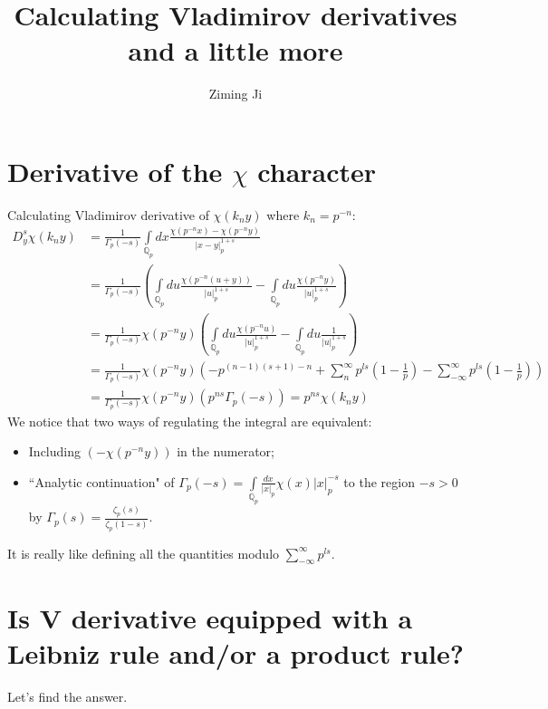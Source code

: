 \documentclass[12pt]{article}
\begin{document}
 
\title{Calculating Vladimirov derivatives and a little more}
\author{Ziming Ji}
 
\maketitle
 
\section{Derivative of the $\chi$ character}
Calculating Vladimirov derivative of $\chi(k_ny)$ where $k_n=p^{-n}$:
\begin{equation}
\begin{aligned}
D^s_y \chi(k_n y)&=\frac{1}{\Gamma_p (-s)} \int\limits _{\mathbb{Q}_p}dx \frac{\chi( p^{-n} x) - \chi( p^{-n}y)}{|x-y|_p^{1+s}}\\
&=\frac{1}{\Gamma_p (-s)} \left(\int\limits _{\mathbb{Q}_p}du \frac{\chi( p^{-n} (u+y))}{|u|_p^{1+s}}-\int\limits _{\mathbb{Q}_p}du \frac{\chi( p^{-n} y)}{|u|_p^{1+s}}\right)\\
&=\frac{1}{\Gamma_p (-s)} \chi( p^{-n} y)\left(\int\limits _{\mathbb{Q}_p}du \frac{\chi( p^{-n} u)}{|u|_p^{1+s}}-\int\limits _{\mathbb{Q}_p}du \frac{1}{|u|_p^{1+s}}\right)\\
&=\frac{1}{\Gamma_p (-s)} \chi( p^{-n} y)\left(-p^{(n-1)(s+1)-n}+\sum\limits_n^\infty p^{ls}(1-\frac{1}{p})-\sum\limits_{-\infty}^\infty p^{ls}(1-\frac{1}{p})\right)\\
&=\frac{1}{\Gamma_p (-s)} \chi( p^{-n} y)\left(p^{ns}\Gamma_p(-s)\right)=p^{ns}\chi(k_n y)
\end{aligned}
\end{equation}
We notice that two ways of regulating the integral are equivalent:
\begin{itemize}
\item Including $(- \chi( p^{-n}y))$ in the numerator;
\item ``Analytic continuation" of $\Gamma_p(-s)=\int\limits_{\mathbb{Q}_p}\frac{dx}{|x|_p}\chi(x)|x|_p^{-s}$ to the region $-s>0$ by $\Gamma_p(s)=\frac{\zeta_p(s)}{\zeta_p(1-s)}$.
\end{itemize}
It is really like defining all the quantities modulo $\sum\limits_{-\infty}^\infty p^{ls}$.
\section{Is V derivative equipped with a Leibniz rule and/or a product rule?}
Let's find the answer.
\end{document}

